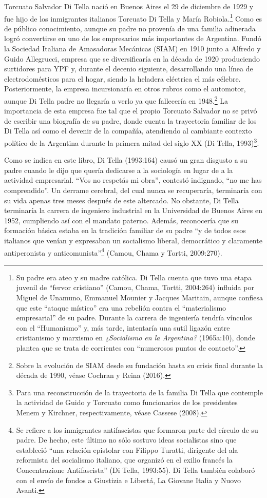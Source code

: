 Torcuato Salvador Di Tella nació en Buenos Aires el 29 de diciembre de 1929 y fue hijo de los inmigrantes italianos Torcuato Di Tella y María Robiola.\footnote{Su padre era ateo y su madre católica. Di Tella cuenta que tuvo una etapa juvenil de ``fervor cristiano'' (Camou, Chama, Tortti, 2004:264) influida por Miguel de Unamuno, Emmanuel Mounier y Jacques Maritain, aunque confiesa que este ``ataque místico'' era una rebelión contra el ``materialismo empresarial'' de su padre. Durante la carrera de ingeniería tendría vínculos con el ``Humanismo'' y, más tarde, intentaría una sutil ligazón entre cristianismo y marxismo en \emph{¿Socialismo en la Argentina?} (1965a:10), donde plantea que se trata de corrientes con ``numerosos puntos de contacto''.} Como es de público conocimiento, aunque su padre no provenía de una familia adinerada logró convertirse en uno de los empresarios más importantes de Argentina. Fundó la Sociedad Italiana de Amasadoras Mecánicas (SIAM) en 1910 junto a Alfredo y Guido Allegrucci, empresa que se diversificaría en la década de 1920 produciendo surtidores para YPF y, durante el decenio siguiente, desarrollando una línea de electrodomésticos para el hogar, siendo la heladera eléctrica el más célebre. Posteriormente, la empresa incursionaría en otros rubros como el automotor, aunque Di Tella padre no llegaría a verlo ya que fallecería en 1948.\footnote{Sobre la evolución de SIAM desde su fundación hasta su crisis final durante la década de 1990, véase Cochran y Reina (2016).} La importancia de esta empresa fue tal que el propio Torcuato Salvador no se privó de escribir una biografía de su padre, donde cuenta la trayectoria familiar de los Di Tella así como el devenir de la compañía, atendiendo al cambiante contexto político de la Argentina durante la primera mitad del siglo XX (Di Tella, 1993)\footnote{Para una reconstrucción de la trayectoria de la familia Di Tella que contemple la actividad de Guido y Torcuato como funcionarios de los presidentes Menem y Kirchner, respectivamente, véase Cassese (2008).}.

Como se indica en este libro, Di Tella (1993:164) causó un gran disgusto a su padre cuando le dijo que quería dedicarse a la sociología en lugar de a la actividad empresarial. ``Vos no respetás mi obra'', contestó indignado, ``no me has comprendido''. Un derrame cerebral, del cual nunca se recuperaría, terminaría con su vida apenas tres meses después de este altercado. No obstante, Di Tella terminaría la carrera de ingeniero industrial en la Universidad de Buenos Aires en 1952, cumpliendo así con el mandato paterno. Además, reconocería que su formación básica estaba en la tradición familiar de su padre ``y de todos esos italianos que venían y expresaban un socialismo liberal, democrático y claramente antiperonista y anticomunista''\footnote{Se refiere a los inmigrantes antifascistas que formaron parte del círculo de su padre. De hecho, este último no sólo sostuvo ideas socialistas sino que estableció ``una relación epistolar con Filippo Turatti, dirigente del ala reformista del socialismo italiano, que organizó en el exilio francés la Concentrazione Antifascista'' (Di Tella, 1993:55). Di Tella también colaboró con el envío de fondos a Giustizia e Libertá, La Giovane Italia y Nuovo Avanti.} (Camou, Chama y Tortti, 2009:270).

